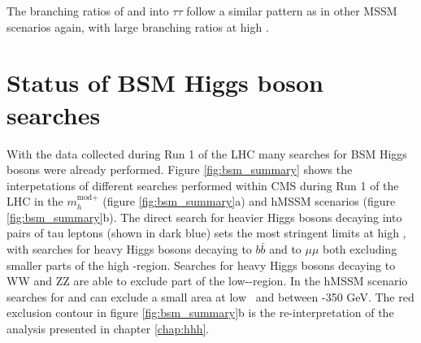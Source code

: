 The branching ratios of \PHiggs and \PHiggsps into $\tau\tau$ follow a similar
pattern as in other MSSM scenarios again, with large branching ratios at high \tanb.

\section{Status of BSM Higgs boson searches}
\label{sec:theory_BSMH_status}
With the data collected during 
Run 1 of the \ac{LHC} many searches for BSM Higgs
bosons were already performed. Figure \ref{fig:bsm_summary} shows the interpetations
of different searches performed within \acs{CMS} during Run 1 of the \acs{LHC}
in the $m_{h}^{\text{mod+}}$ (figure \ref{fig:bsm_summary}a)
and hMSSM scenarios (figure \ref{fig:bsm_summary}b). The direct search for heavier Higgs bosons decaying into pairs
of tau leptons (shown in dark blue) sets the most stringent limits at high \tanb, with searches for 
heavy Higgs bosons decaying to $b\bar{b}$ and to $\mu\mu$ both excluding smaller parts of the high \tanb-region.
Searches for heavy Higgs bosons decaying to WW and ZZ are able to exclude part of the low-\tanb-region. In the 
hMSSM scenario searches for \Htohh and \AtoZh can exclude a small area at low \tanb~and between -350 GeV.
The red exclusion contour in figure \ref{fig:bsm_summary}b is the re-interpretation of the analysis presented in
chapter \ref{chap:hhh}.

